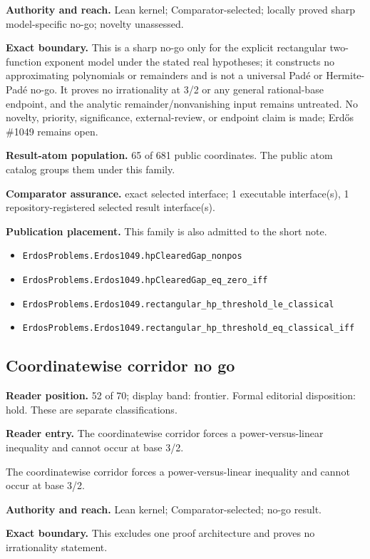 \documentclass[11pt]{article}
\begin{document}
\textbf{Authority and reach.} Lean kernel; Comparator-selected; locally proved sharp model-specific no-go; novelty unassessed.

\textbf{Exact boundary.} This is a sharp no-go only for the explicit rectangular two-function exponent model under the stated real hypotheses; it constructs no approximating polynomials or remainders and is not a universal Padé or Hermite-Padé no-go. It proves no irrationality at 3/2 or any general rational-base endpoint, and the analytic remainder/nonvanishing input remains untreated. No novelty, priority, significance, external-review, or endpoint claim is made; Erdős \#1049 remains open.

\textbf{Result-atom population.} 65 of 681 public coordinates. The public atom catalog groups them under this family.

\textbf{Comparator assurance.} exact selected interface; 1 executable interface(s), 1 repository-registered selected result interface(s).

\textbf{Publication placement.} This family is also admitted to the short note.

\begin{itemize}
  \item \nolinkurl{ErdosProblems.Erdos1049.hpClearedGap_nonpos}
  \item \nolinkurl{ErdosProblems.Erdos1049.hpClearedGap_eq_zero_iff}
  \item \nolinkurl{ErdosProblems.Erdos1049.rectangular_hp_threshold_le_classical}
  \item \nolinkurl{ErdosProblems.Erdos1049.rectangular_hp_threshold_eq_classical_iff}
\end{itemize}

\subsection{Coordinatewise corridor no go}
\textbf{Reader position.} 52 of 70; display band: frontier.  Formal editorial disposition: hold.  These are separate classifications.

\textbf{Reader entry.} The coordinatewise corridor forces a power-versus-linear inequality and cannot occur at base 3/2.

The coordinatewise corridor forces a power-versus-linear inequality and cannot occur at base 3/2.

\textbf{Authority and reach.} Lean kernel; Comparator-selected; no-go result.

\textbf{Exact boundary.} This excludes one proof architecture and proves no irrationality statement.
\end{document}
